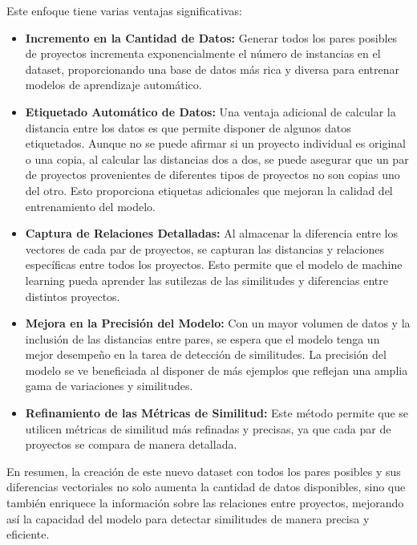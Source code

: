 Este enfoque tiene varias ventajas significativas:

\begin{itemize}
	\item {\bf Incremento en la Cantidad de Datos:} Generar todos los pares posibles de proyectos incrementa exponencialmente el número de instancias en el dataset, proporcionando una base de datos más rica y diversa para entrenar modelos de aprendizaje automático.
	
	\item {\bf Etiquetado Automático de Datos:} Una ventaja adicional de calcular la distancia entre los datos es que permite disponer de algunos datos etiquetados. Aunque no se puede afirmar si un proyecto individual es original o una copia, al calcular las distancias dos a dos, se puede asegurar que un par de proyectos provenientes de diferentes tipos de proyectos no son copias uno del otro. Esto proporciona etiquetas adicionales que mejoran la calidad del entrenamiento del modelo.

	\item {\bf Captura de Relaciones Detalladas:} Al almacenar la diferencia entre los vectores de cada par de proyectos, se capturan las distancias y relaciones específicas entre todos los proyectos. Esto permite que el modelo de machine learning pueda aprender las sutilezas de las similitudes y diferencias entre distintos proyectos.
	
	\item {\bf Mejora en la Precisión del Modelo:} Con un mayor volumen de datos y la inclusión de las distancias entre pares, se espera que el modelo tenga un mejor desempeño en la tarea de detección de similitudes. La precisión del modelo se ve beneficiada al disponer de más ejemplos que reflejan una amplia gama de variaciones y similitudes.
	
	\item {\bf Refinamiento de las Métricas de Similitud:} Este método permite que se utilicen métricas de similitud más refinadas y precisas, ya que cada par de proyectos se compara de manera detallada. 

\end{itemize}

En resumen, la creación de este nuevo dataset con todos los pares posibles y sus diferencias vectoriales no solo aumenta la cantidad de datos disponibles, sino que también enriquece la información sobre las relaciones entre proyectos, mejorando así la capacidad del modelo para detectar similitudes de manera precisa y eficiente.  

